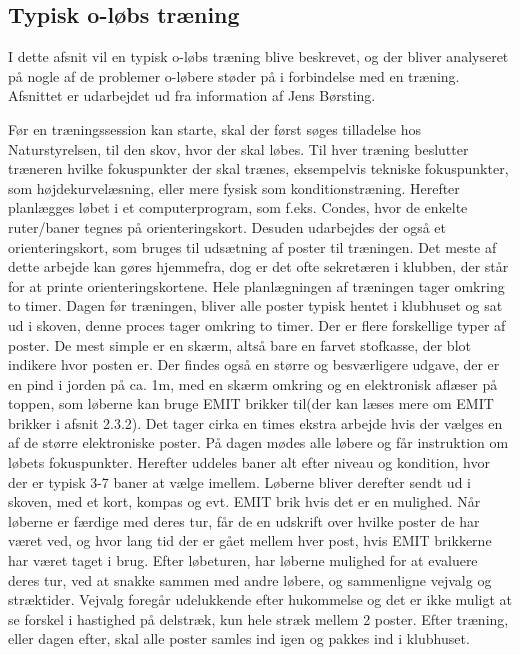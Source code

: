 \subsection{Typisk o-løbs træning}
I dette afsnit vil en typisk o-løbs træning blive beskrevet, og der bliver analyseret på nogle af de problemer o-løbere støder på i forbindelse med en træning. Afsnittet er udarbejdet ud fra information af Jens Børsting.

Før en træningssession kan starte, skal der først søges tilladelse hos Naturstyrelsen, til den skov, hvor der skal løbes. \newline
Til hver træning beslutter træneren hvilke fokuspunkter der skal trænes, eksempelvis tekniske fokuspunkter, som højdekurvelæsning, eller mere fysisk som konditionstræning. Herefter planlægges løbet i et computerprogram, som f.eks. Condes, hvor de enkelte ruter/baner tegnes på orienteringskort. Desuden udarbejdes der også et orienteringskort, som bruges til udsætning af poster til træningen. Det meste af dette arbejde kan gøres hjemmefra, dog er det ofte sekretæren i klubben, der står for at printe orienteringskortene. Hele planlægningen af træningen tager omkring to timer. Dagen før træningen, bliver alle poster typisk hentet i klubhuset og sat ud i skoven, denne proces tager omkring to timer. Der er flere forskellige typer af poster. De mest simple er en skærm, altså bare en farvet stofkasse, der blot indikere hvor posten er. Der findes også en større og besværligere udgave, der er en pind i jorden på ca. 1m, med en skærm omkring og en elektronisk aflæser på toppen, som løberne kan bruge EMIT brikker til(der kan læses mere om EMIT brikker i afsnit 2.3.2). Det tager cirka en times ekstra arbejde hvis der vælges en af de større elektroniske poster.\newline
På dagen mødes alle løbere og får instruktion om løbets fokuspunkter. Herefter uddeles baner alt efter niveau og kondition, hvor der er typisk 3-7 baner at vælge imellem. Løberne bliver derefter sendt ud i skoven, med et kort, kompas og evt. EMIT brik hvis det er en mulighed. Når løberne er færdige med deres tur, får de en udskrift over hvilke poster de har været ved, og hvor lang tid der er gået mellem hver post, hvis EMIT brikkerne har været taget i brug.
Efter løbeturen, har løberne mulighed for at evaluere deres tur, ved at snakke sammen med andre løbere, og sammenligne vejvalg og stræktider. Vejvalg foregår udelukkende efter hukommelse og det er ikke muligt at se forskel i hastighed på delstræk, kun hele stræk mellem 2 poster. 
Efter træning, eller dagen efter, skal alle poster samles ind igen og pakkes ind i klubhuset.\newline


